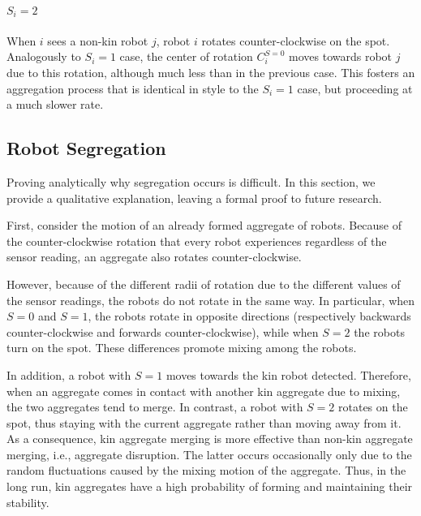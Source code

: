 \documentclass[letterpaper, 10 pt, conference]{ieeeconf}
\begin{document}
\paragraph{$S_i = 2$}
When $i$ sees a non-kin robot $j$, robot $i$ rotates counter-clockwise on the
spot. Analogously to $S_i = 1$ case, the center of rotation $C^{S=0}_i$ moves
towards robot $j$ due to this rotation, although much less than in the previous
case. This fosters an aggregation process that is identical in style to the
$S_i = 1$ case, but proceeding at a much slower rate.

\subsection{Robot Segregation}
\label{subsec:analysis_aggregate}

Proving analytically why segregation occurs is difficult. In this section, we
provide a qualitative explanation, leaving a formal proof to future research.

First, consider the motion of an already formed aggregate of robots. Because of
the counter-clockwise rotation that every robot experiences regardless of the
sensor reading, an aggregate also rotates counter-clockwise.

However, because of the different radii of rotation due to the different values
of the sensor readings, the robots do not rotate in the same way. In particular,
when $S=0$ and $S=1$, the robots rotate in opposite directions (respectively
backwards counter-clockwise and forwards counter-clockwise), while when $S=2$
the robots turn on the spot. These differences promote mixing among the robots.

In addition, a robot with $S=1$ moves towards the kin robot detected. Therefore,
when an aggregate comes in contact with another kin aggregate due to mixing, the
two aggregates tend to merge. In contrast, a robot with $S=2$ rotates on the
spot, thus staying with the current aggregate rather than moving away from
it. As a consequence, kin aggregate merging is more effective than non-kin
aggregate merging, i.e., aggregate disruption. The latter occurs occasionally
only due to the random fluctuations caused by the mixing motion of the
aggregate. Thus, in the long run, kin aggregates have a high probability of
forming and maintaining their stability.



\end{document}
